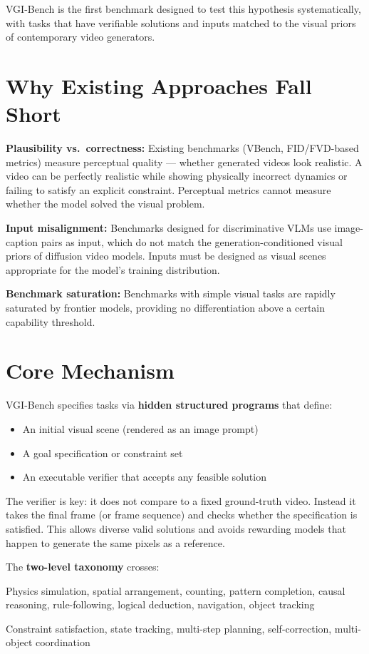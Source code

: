 \documentclass[10pt,twocolumn]{article}
\begin{document}
VGI-Bench is the first benchmark designed to test this hypothesis
systematically, with tasks that have verifiable solutions and inputs
matched to the visual priors of contemporary video generators.

\section{Why Existing Approaches Fall Short}

\textbf{Plausibility vs.\ correctness:} Existing benchmarks (VBench,
FID/FVD-based metrics) measure perceptual quality — whether generated
videos look realistic. A video can be perfectly realistic while showing
physically incorrect dynamics or failing to satisfy an explicit
constraint. Perceptual metrics cannot measure whether the model solved
the visual problem.

\textbf{Input misalignment:} Benchmarks designed for discriminative
VLMs use image-caption pairs as input, which do not match the
generation-conditioned visual priors of diffusion video models. Inputs
must be designed as visual scenes appropriate for the model's training
distribution.

\textbf{Benchmark saturation:} Benchmarks with simple visual tasks
are rapidly saturated by frontier models, providing no differentiation
above a certain capability threshold.

\section{Core Mechanism}

VGI-Bench specifies tasks via \textbf{hidden structured programs}
that define:
\begin{itemize}[itemsep=2pt,parsep=0pt]
  \item An initial visual scene (rendered as an image prompt)
  \item A goal specification or constraint set
  \item An executable verifier that accepts any feasible solution
\end{itemize}

The verifier is key: it does not compare to a fixed ground-truth
video. Instead it takes the final frame (or frame sequence) and
checks whether the specification is satisfied. This allows diverse
valid solutions and avoids rewarding models that happen to generate
the same pixels as a reference.

The \textbf{two-level taxonomy} crosses:
\begin{description}[leftmargin=0pt,itemsep=2pt,parsep=0pt,font=\small\bfseries]
  \item[Task domain (9):] Physics simulation, spatial arrangement,
    counting, pattern completion, causal reasoning, rule-following,
    logical deduction, navigation, object tracking
  \item[Skill tag (5):] Constraint satisfaction, state tracking,
    multi-step planning, self-correction, multi-object coordination
\end{description}
\end{document}
